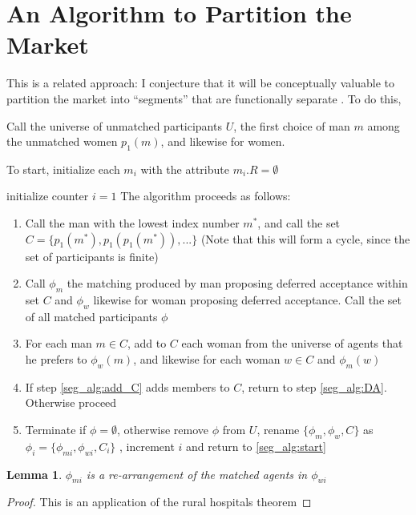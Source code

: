 \documentclass[WP]{AEA}
\newtheorem{lemma}{Lemma}
\begin{document}
\section{An Algorithm to Partition the Market} \label{sect:partition}
This is a related approach: I conjecture that it will be conceptually valuable to partition the market into ``segments'' that are functionally separate .  To do this, 


Call the universe of unmatched participants $U$, the first choice of man $m$ among the unmatched women $p_1(m)$, and likewise for women.

To start, initialize each $m_i$ with the attribute $m_i.R = \emptyset$


 initialize counter $i = 1$  The algorithm proceeds as follows: 


\begin{enumerate}
	\item \label{seg_alg:start} Call the man with the lowest index number $m^*$, and call the set $C = \{p_1(m^*), p_1(p_1(m^*)), ...\}$ (Note that this will form a cycle, since the set of participants is finite)
	\item \label{seg_alg:DA} Call $\phi_m$ the matching produced by man proposing deferred acceptance within set $C$ and $\phi_w$ likewise for woman proposing deferred acceptance.  Call the set of all matched participants $\phi$ 
	\item \label{seg_alg:add_C} For each man $m \in C$, add  to $C$ each woman from the universe of agents that he prefers to $\phi_w(m)$, and likewise for each woman $w \in C$ and $\phi_m(w)$
	\item If step \ref{seg_alg:add_C} adds members to $C$, return to step \ref{seg_alg:DA}.  Otherwise proceed
	\item Terminate if $\phi =  \emptyset$, otherwise remove $\phi$ from $U$, rename $\{\phi_m, \phi_w, C\}$ as $\phi_i = \{\phi_{mi}, \phi_{wi}, C_i\}$ , increment $i$ and return to \ref{seg_alg:start}
	
\end{enumerate}

\begin{lemma}
	$\phi_{mi}$ is a re-arrangement of the matched agents in $\phi_{wi}$
\end{lemma}
\begin{proof}
	This is an application of the rural hospitals theorem
\end{proof}
\end{document}
